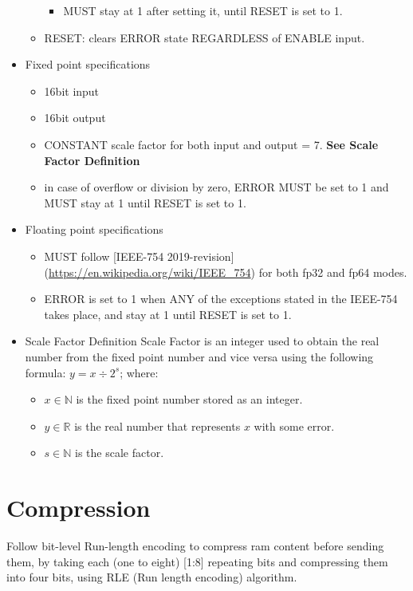 \documentclass[12pt]{report}
\begin{document}
\begin{itemize}
\begin{itemize}
\begin{itemize}
            \item MUST stay at 1 after setting it, until RESET is set to 1.
        \end{itemize}
        \item RESET: clears ERROR state REGARDLESS of ENABLE input.
    \end{itemize}
    \item Fixed point specifications
    \begin{itemize}
        \item 16bit input
        \item 16bit output
        \item CONSTANT scale factor for both input and output = 7. \textbf{See Scale Factor Definition}
        \item in case of overflow or division by zero, ERROR MUST be set to 1 and MUST stay at 1 until RESET is set to 1.
    \end{itemize}
    \item Floating point specifications
    \begin{itemize}
        \item MUST follow [IEEE-754 2019-revision] (\url{https://en.wikipedia.org/wiki/IEEE_754}) for both fp32 and fp64 modes.
        \item ERROR is set to 1 when ANY of the exceptions stated in the IEEE-754 takes place, and stay at 1 until RESET is set to 1.
    \end{itemize}
    \item Scale Factor Definition
    Scale Factor is an integer used to obtain the real number from the fixed point number and vice versa using the following formula: 
    $y = x \div 2^s$; where: 
    \begin{itemize}
        \item $x \in \mathbb{N}$ is the fixed point number stored as an integer.
        \item $y \in \mathbb{R}$ is the real number that represents $x$ with some error.
        \item $s \in \mathbb{N}$ is the scale factor.
    \end{itemize}
\end{itemize}

\section{Compression}
Follow bit-level Run-length encoding to compress ram content before sending them, by taking each (one to eight) [1:8] repeating bits and compressing them into four bits, using RLE (Run length encoding) algorithm.
\end{document}
